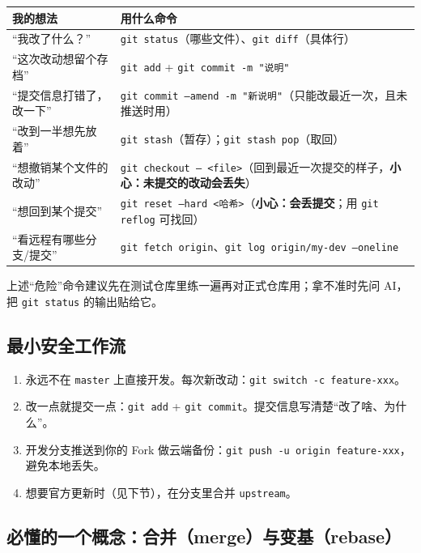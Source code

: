 \documentclass[11pt]{ctexart}
\newcommand{\code}[1]{\texttt{\small #1}}
\begin{document}
\begin{table}[htbp]
\centering
\begin{tabular}{@{}p{5cm}p{11.5cm}@{}}
\toprule
我的想法 & 用什么命令 \\
\midrule
“我改了什么？” & \code{git status}（哪些文件）、\code{git diff}（具体行） \\
“这次改动想留个存档” & \code{git add} + \code{git commit -m "说明"} \\
“提交信息打错了，改一下” & \code{git commit --amend -m "新说明"}（只能改最近一次，且未推送时用） \\
“改到一半想先放着” & \code{git stash}（暂存）；\code{git stash pop}（取回） \\
“想撤销某个文件的改动” & \code{git checkout -- <file>}（回到最近一次提交的样子，\textbf{小心：未提交的改动会丢失}） \\
“想回到某个提交” & \code{git reset --hard <哈希>}（\textbf{小心：会丢提交}；用 \code{git reflog} 可找回） \\
“看远程有哪些分支/提交” & \code{git fetch origin}、\code{git log origin/my-dev --oneline} \\
\bottomrule
\end{tabular}
\end{table}

\noindent 上述“危险”命令建议先在测试仓库里练一遍再对正式仓库用；拿不准时先问 AI，把 \code{git status} 的输出贴给它。

\subsection{最小安全工作流}

\begin{enumerate}[itemsep=1pt]
  \item 永远不在 \code{master} 上直接开发。每次新改动：\code{git switch -c feature-xxx}。
  \item 改一点就提交一点：\code{git add} + \code{git commit}。提交信息写清楚“改了啥、为什么”。
  \item 开发分支推送到你的 Fork 做云端备份：\code{git push -u origin feature-xxx}，避免本地丢失。
  \item 想要官方更新时（见下节），在分支里合并 \code{upstream}。
\end{enumerate}

\subsection{必懂的一个概念：合并（merge）与变基（rebase）}
\end{document}
